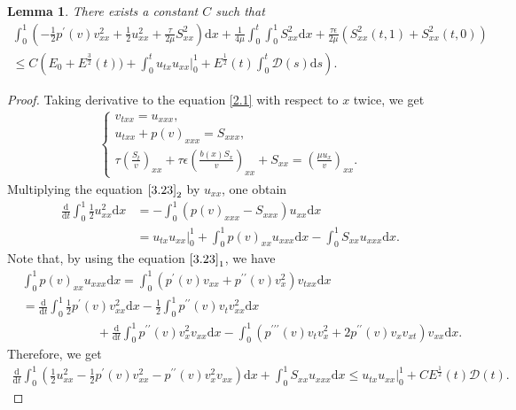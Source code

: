 \documentclass[10pt,reqno]{amsart}
\numberwithin{equation}{section}
\newtheorem{lemma}[theorem]{Lemma}
\newcommand{\dif}{\mathrm{d}}
\begin{document}
\begin{lemma}\label{Le3.9}
There exists a constant $C$ such that
\begin{align}
\int_0^1 (-\frac{1}{2} p^\prime(v)v_{xx}^2+\frac{1}{2}u_{xx}^2+\frac{\tau}{2\mu}S_{xx}^2 )\dif x +\frac{1}{4\mu}\int_0^t\int_0^1 S_{xx}^2 \dif x+\frac{\tau\epsilon}{2\mu}(S_{xx}^2(t,1)+S_{xx}^2(t,0)) \nonumber\\
\le C \left(E_0+E^\frac{3}{2}(t))+\int_0^t u_{tx}u_{xx}\big|_0^1 +E^\frac{1}{2}(t) \int_0^t \mathcal D(s)\dif s  \right). \label{3.22}
\end{align}
\end{lemma}
\begin{proof}
Taking derivative to the equation \eqref{2.1} with respect to $x$ twice, we get
\begin{align}\label{3.23}
\begin{cases}
v_{txx}=u_{xxx},\\
u_{txx}+p(v)_{xxx}=S_{xxx},\\
\tau \left(\frac{S_t}{v}\right)_{xx}+\tau \epsilon \left(\frac{b(x)S_x}{v}\right)_{xx}+S_{xx}=\left(\frac{\mu u_x}{v}\right)_{xx}.
\end{cases}
\end{align}
Multiplying the  equation $\eqref{3.23}_2$ by $u_{xx}$, one obtain
\begin{align*}
\frac{\dif}{\dif t} \int_0^1 \frac{1}{2} u_{xx}^2 \dif x 
&=-\int_0^1 (p(v)_{xxx}-S_{xxx})u_{xx}\dif x\\
&=u_{tx} u_{xx}\big|_0^1 +\int_0^1 p(v)_{xx} u_{xxx}\dif x-\int_0^1 S_{xx} u_{xxx}\dif x.
\end{align*}
Note that, by using the equation $\eqref{3.23}_1$, we have
\begin{align*}
&\int_0^1 p(v)_{xx}u_{xxx}\dif x=\int_0^1 (p^\prime(v) v_{xx}+p^{\prime\prime}(v) v_x^2)v_{txx} \dif x\\
&=\frac{\dif}{\dif t} \int_0^1 \frac{1}{2}p^\prime(v) v_{xx}^2 \dif x-\frac{1}{2} \int_0^1 p^{\prime\prime}(v)v_t v_{xx}^2 \dif x\\
&\qquad\qquad\qquad+\frac{\dif}{\dif t} \int_0^1 p^{\prime\prime}(v) v_x^2 v_{xx} \dif x-\int_0^1 (p^{\prime\prime\prime}(v)v_t v_{x}^2+2p^{\prime\prime}(v) v_x v_{xt} )v_{xx}\dif x.
\end{align*}
Therefore, we get
\begin{align}\label{3.24}
\frac{\dif}{\dif t} \int_0^1 (\frac{1}{2} u_{xx}^2-\frac{1}{2} p^\prime(v) v_{xx}^2-p^{\prime\prime}(v)v_x^2v_{xx}) \dif x+\int_0^1 S_{xx} u_{xxx}\dif x\le u_{tx}u_{xx}\big|_0^1+C E^\frac{1}{2}(t) \mathcal D(t).

\end{align}
\end{proof}
\end{document}
